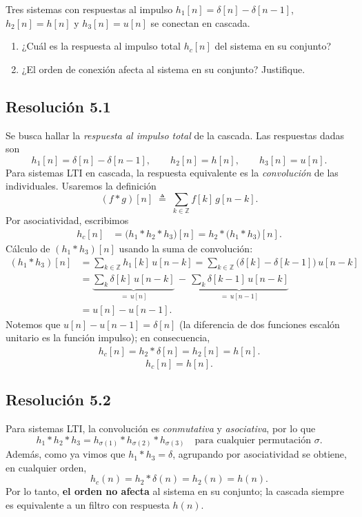 \documentclass[
  11pt,
  letterpaper,
   addpoints,
   answers
  ]{exam}
\begin{document}
\begin{questions}
\question Tres sistemas con respuestas al impulso \(h_1[n]=\delta[n]-\delta[n-1]\), \(h_2[n]=h[n]\) y \(h_3[n]=u[n]\) se conectan en cascada.
\begin{enumerate}
  \item ¿Cuál es la respuesta al impulso total \(h_c[n]\) del sistema en su conjunto?
  \item ¿El orden de conexión afecta al sistema en su conjunto? Justifique.
\end{enumerate}
\begin{solution}
  \subsection*{Resolución 5.1}
  Se busca hallar la \emph{respuesta al impulso total} de la cascada. Las respuestas dadas son
  \[ h_1[n]=\delta[n]-\delta[n-1],\qquad h_2[n]=h[n],\qquad h_3[n]=u[n]. \]
  Para sistemas LTI en cascada, la respuesta equivalente es la \emph{convolución} de las individuales. Usaremos la definición
  \[
    (f*g)[n]\;\triangleq\;\sum_{k\in\mathbb{Z}} f[k] \, g[n-k].
  \]
  Por asociatividad, escribimos
  \begin{align}
    h_c[n] 
    &= \big(h_1*h_2*h_3\big)[n]
     = h_2 * \big(h_1*h_3\big)[n].
  \end{align}
  Cálculo de $(h_1*h_3)[n]$ usando la suma de convolución:
  \begin{align}
    (h_1*h_3)[n]
      &= \sum_{k\in\mathbb{Z}} h_1[k] \, u[n-k]
       = \sum_{k\in\mathbb{Z}} \big(\delta[k]-\delta[k-1]\big) \, u[n-k]\\
      &= \underbrace{\sum_{k} \delta[k] \, u[n-k]}_{=\,u[n]}
       \, - \, \underbrace{\sum_{k} \delta[k-1] \, u[n-k]}_{=\,u[n-1]} \\
      &= u[n]-u[n-1].
  \end{align}
  Notemos que $u[n]-u[n-1]=\delta[n]$ (la diferencia de dos funciones escalón unitario es la función impulso); en consecuencia,
\begin{align}
  h_{c}[n] = h_2 * \delta[n] = h_2[n] = h[n].
\end{align}
  \[
    \boxed{\,h_c[n]=h[n].\,}
  \]


  \subsection*{Resolución 5.2}
Para sistemas LTI, la convolución es \emph{conmutativa} y \emph{asociativa}, por lo que
  \[
    h_1*h_2*h_3 = h_{\sigma(1)}*h_{\sigma(2)}*h_{\sigma(3)}\quad \text{para cualquier permutación }\sigma.
  \]
  Además, como ya vimos que $h_1*h_3=\delta$, agrupando por asociatividad se obtiene, en cualquier orden,
  \[
    h_c(n) = h_2*\delta(n) = h_2(n) = h(n).
  \]
  Por lo tanto, \textbf{el orden no afecta} al sistema en su conjunto; la cascada siempre es equivalente a un filtro con respuesta $h(n)$.
\end{solution}


\end{questions}
\end{document}
